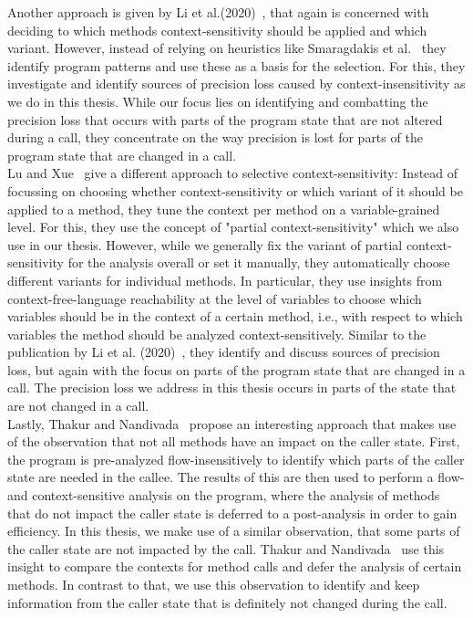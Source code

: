   Another approach is given by Li et al.(2020)~\parencite{li2020principled}, that again is concerned with deciding to which methods context-sensitivity should be applied and which variant. However, instead of relying on heuristics like Smaragdakis et al.~\parencite{smaragdakis2014introspective} they identify program patterns and use these as a basis for the selection. For this, they investigate and identify sources of precision loss caused by context-insensitivity as we do in this thesis. While our focus lies on identifying and combatting the precision loss that occurs with parts of the program state that are not altered during a call, they concentrate on the way precision is lost for parts of the program state that are changed in a call.\\
  Lu and Xue~\parencite{lu2019precision} give a different approach to selective context-sensitivity: Instead of focussing on choosing whether context-sensitivity or which variant of it should be applied to a method, they tune the context per method on a variable-grained level. For this, they use the concept of "partial context-sensitivity" which we also use in our thesis. However, while we generally fix the variant of partial context-sensitivity for the analysis overall or set it manually, they automatically choose different variants for individual methods. In particular, they use insights from context-free-language reachability at the level of variables to choose which variables should be in the context of a certain method, i.e., with respect to which variables the method should be analyzed context-sensitively. Similar to the publication by Li et al. (2020)~\parencite{li2020principled}, they identify and discuss sources of precision loss, but again with the focus on parts of the program state that are changed in a call. The precision loss we address in this thesis occurs in parts of the state that are not changed in a call.\\
  Lastly, Thakur and Nandivada~\parencite{thakur2019compare} propose an interesting approach that makes use of the observation that not all methods have an impact on the caller state. First, the program is pre-analyzed flow-insensitively to identify which parts of the caller state are needed in the callee. The results of this are then used to perform a flow- and context-sensitive analysis on the program, where the analysis of methods that do not impact the caller state is deferred to a post-analysis in order to gain efficiency. In this thesis, we make use of a similar observation, that some parts of the caller state are not impacted by the call. Thakur and Nandivada~\parencite{thakur2019compare} use this insight to compare the contexts for method calls and defer the analysis of certain methods. In contrast to that, we use this observation to identify and keep information from the caller state that is definitely not changed during the call.\\
